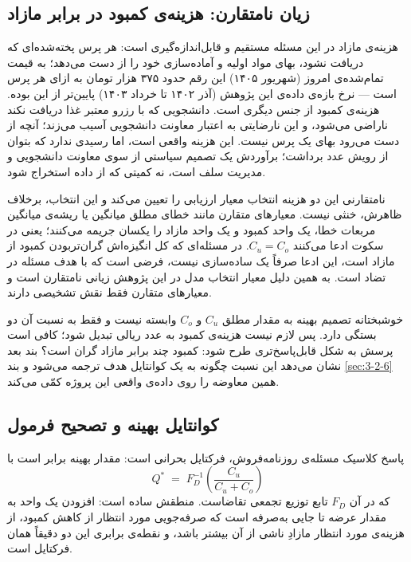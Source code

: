\subsection{زیان نامتقارن: هزینه‌ی کمبود در برابر مازاد}
\label{sec:2-2-2}

هزینه‌ی مازاد در این مسئله مستقیم و قابل‌اندازه‌گیری است: هر پرس پخته‌شده‌ای که دریافت
نشود، بهای مواد اولیه و آماده‌سازی خود را از دست می‌دهد؛ به قیمت تمام‌شده‌ی امروز (شهریور
۱۴۰۵) این رقم حدود ۳۷۵ هزار تومان به ازای هر پرس است — نرخ بازه‌ی داده‌ی این پژوهش
(آذر ۱۴۰۲ تا خرداد ۱۴۰۳) پایین‌تر از این بوده. هزینه‌ی کمبود از جنس دیگری است. دانشجویی
که با رزرو معتبر غذا دریافت نکند ناراضی می‌شود، و این نارضایتی به اعتبار معاونت
دانشجویی آسیب می‌زند؛ آنچه از دست می‌رود بهای یک پرس نیست. این هزینه واقعی است، اما
رسیدی ندارد که بتوان از رویش عدد برداشت؛ برآوردش یک تصمیم سیاستی از سوی معاونت
دانشجویی و مدیریت سلف است، نه کمیتی که از داده استخراج شود.

نامتقارنی این دو هزینه انتخاب معیار ارزیابی را تعیین می‌کند و این انتخاب، برخلاف
ظاهرش، خنثی نیست. معیارهای متقارن مانند خطای مطلق میانگین یا ریشه‌ی میانگین مربعات خطا،
یک واحد کمبود و یک واحد مازاد را یکسان جریمه می‌کنند؛ یعنی در سکوت ادعا می‌کنند
$C_u = C_o$. در مسئله‌ای که کل انگیزه‌اش گران‌تربودن کمبود از مازاد است، این ادعا صرفاً
یک ساده‌سازی نیست، فرضی است که با هدف مسئله در تضاد است. به همین دلیل معیار انتخاب مدل
در این پژوهش زیانی نامتقارن است و معیارهای متقارن فقط نقش تشخیصی دارند.

خوشبختانه تصمیم بهینه به مقدار مطلق $C_u$ و $C_o$ وابسته نیست و فقط به نسبت آن دو
بستگی دارد. پس لازم نیست هزینه‌ی کمبود به عدد ریالی تبدیل شود؛ کافی است پرسش به شکل
قابل‌پاسخ‌تری طرح شود: کمبود چند برابر مازاد گران است؟ بند بعد نشان می‌دهد این نسبت
چگونه به یک کوانتایل هدف ترجمه می‌شود و بند \ref{sec:3-2-6} همین معاوضه را روی داده‌ی
واقعی این پروژه کمّی می‌کند.

\subsection{کوانتایل بهینه و تصحیح فرمول}
\label{sec:2-2-3}

پاسخ کلاسیک مسئله‌ی روزنامه‌فروش، فرکتایل بحرانی است:
مقدار بهینه برابر است با
\[ Q^{*} \;=\; F_D^{-1}\!\left(\frac{C_u}{C_u + C_o}\right) \]
که در آن $F_D$ تابع توزیع تجمعی تقاضاست. منطقش ساده است: افزودن یک واحد به مقدار عرضه
تا جایی به‌صرفه است که صرفه‌جویی مورد انتظار از کاهش کمبود، از هزینه‌ی مورد انتظار مازادِ
ناشی از آن بیشتر باشد، و نقطه‌ی برابری این دو دقیقاً همان فرکتایل است.

